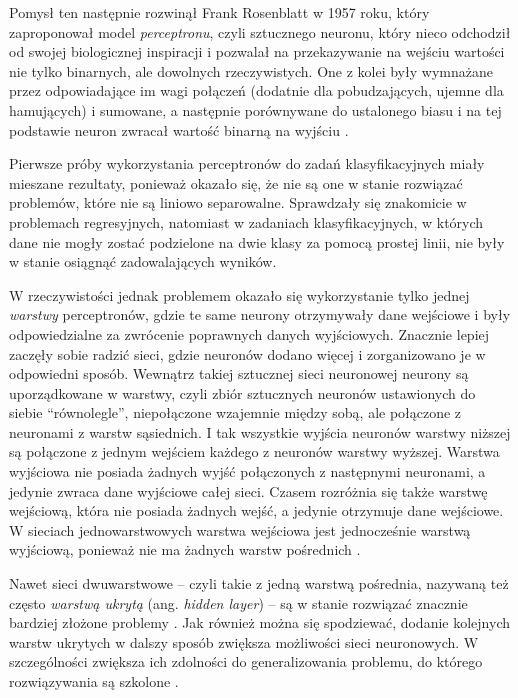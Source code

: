 Pomysł ten następnie rozwinął Frank Rosenblatt w 1957 roku, który zaproponował model \emph{perceptronu}, czyli sztucznego neuronu, który nieco odchodził od swojej biologicznej inspiracji i pozwalał na przekazywanie na wejściu wartości nie tylko binarnych, ale dowolnych rzeczywistych.
One z kolei były wymnażane przez odpowiadające im wagi połączeń (dodatnie dla pobudzających, ujemne dla hamujących) i sumowane, a następnie porównywane do ustalonego biasu i na tej podstawie neuron zwracał wartość binarną na wyjściu \cite{rosenbaltt1957perceptron}.

Pierwsze próby wykorzystania perceptronów do zadań klasyfikacyjnych miały mieszane rezultaty, ponieważ okazało się, że nie są one w stanie rozwiązać problemów, które nie są liniowo separowalne.
Sprawdzały się znakomicie w problemach regresyjnych, natomiast w zadaniach klasyfikacyjnych, w których dane nie mogły zostać podzielone na dwie klasy za pomocą prostej linii, nie były w stanie osiągnąć zadowalających wyników.

W rzeczywistości jednak problemem okazało się wykorzystanie tylko jednej \emph{warstwy} perceptronów, gdzie te same neurony otrzymywały dane wejściowe i były odpowiedzialne za zwrócenie poprawnych danych wyjściowych.
Znacznie lepiej zaczęły sobie radzić sieci, gdzie neuronów dodano więcej i zorganizowano je w odpowiedni sposób.
Wewnątrz takiej sztucznej sieci neuronowej neurony są uporządkowane w warstwy, czyli zbiór sztucznych neuronów ustawionych do siebie ``równolegle'', niepołączone wzajemnie między sobą, ale połączone z neuronami z warstw sąsiednich.
I tak wszystkie wyjścia neuronów warstwy niższej są połączone z jednym wejściem każdego z neuronów warstwy wyższej.
Warstwa wyjściowa nie posiada żadnych wyjść połączonych z następnymi neuronami, a jedynie zwraca dane wyjściowe całej sieci.
Czasem rozróżnia się także warstwę wejściową, która nie posiada żadnych wejść, a jedynie otrzymuje dane wejściowe.
W sieciach jednowarstwowych warstwa wejściowa jest jednocześnie warstwą wyjściową, ponieważ nie ma żadnych warstw pośrednich \cite{bishop1994neural}.

Nawet sieci dwuwarstwowe -- czyli takie z jedną warstwą pośrednia, nazywaną też często \emph{warstwą ukrytą} (ang. \emph{hidden layer}) -- są w stanie rozwiązać znacznie bardziej złożone problemy \cite{huang2000classification}.
Jak również można się spodziewać, dodanie kolejnych warstw ukrytych w dalszy sposób zwiększa możliwości sieci neuronowych.
W szczególności zwiększa ich zdolności do generalizowania problemu, do którego rozwiązywania są szkolone \cite{thomas2017two}.

